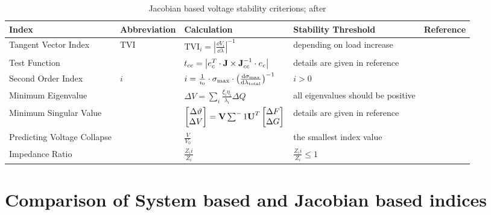 \begin{table}
    \centering
    \small
    \caption{Jacobian based voltage stability criterions; after \textcite{danish_2015}}
    \vspace*{12pt}
    \renewcommand{\arraystretch}{2}
    \begin{tabularx}{23cm}{llXXl}
        \textbf{Index} & \textbf{Abbreviation} & \textbf{Calculation} & \textbf{Stability Threshold} & \textbf{Reference} \\
        \toprule
        Tangent Vector Index & \acs{TVI} & $\mathrm{TVI}_i=\left\lvert \frac{\dd{V_i}}{\dd{\lambda}}\right\rvert^{-1}$ & depending on load increase & \\ \midrule
        Test Function & & $t_{cc}=\left\lvert e^T_c \cdot \mathrm{\textbf{J}} \times \mathrm{\textbf{J}}_{cc}^{-1} \cdot e_c\right\rvert$ & details are given in reference & \\ \midrule
        Second Order Index & $i$ & $i=\frac{1}{i_0} \cdot \sigma_\mathrm{max} \cdot \big( \dv{\sigma_\mathrm{max}}{\lambda_\mathrm{total}} \big)^{-1}$ & $i > 0$ & \\ \midrule
        Minimum Eigenvalue & & $\Delta V=\sum_{i} \frac{\xi_i\eta_i}{\lambda_i} \Delta Q$ & all eigenvalues should be positive & \\ \midrule
        Minimum Singular Value & & $\begin{bmatrix} \Delta \vartheta \\ \Delta V \end{bmatrix}=\mathrm{\textbf{V}} \sum^-1 \mathrm{\textbf{U}}^T \begin{bmatrix} \Delta F \\ \Delta G \end{bmatrix}$ & details are given in reference & \\ \midrule
        Predicting Voltage Collapse & & $\frac{V}{V_0}$ & the smallest index value & \\ \midrule
        Impedance Ratio & & $\frac{Z_ii}{Z_i}$ & $\frac{Z_ii}{Z_i} \leq 1$ & \\
        \bottomrule
    \end{tabularx}
\end{table}



\section{Comparison of System based and Jacobian based indices}
\label{app:jacobian-vs-system-indices}

